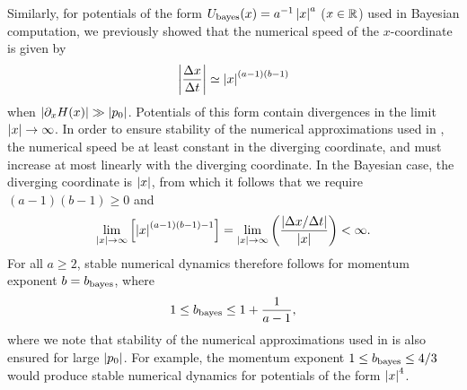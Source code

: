 \documentclass[a4paper]{article}
\begin{document}
Similarly, for potentials of the form $ U_{\rm bayes}(x) = a^{-1} \left| x \right|^a$ ($x \in \mathbb{R}$) used in Bayesian computation, we previously showed that the numerical speed of the $x$-coordinate is given by~\cite{Livingstone2019Kinetic}
\begin{align}
\left| \frac{\Delta x}{\Delta t} \right| \simeq \left| x \right|^{(a - 1)(b -1)} 
\end{align}
when $\left| \partial_x H (x) \right| \gg \left| p_0 \right|$. Potentials of this form contain divergences in the limit $\left| x \right| \to \infty$. In order to ensure stability of the numerical approximations used in , the numerical speed be at least constant in the diverging coordinate, and must increase at most linearly with the diverging coordinate. In the Bayesian case, the diverging coordinate is $\left| x \right|$, from which it follows that we require $(a - 1)(b -1) \ge 0$ and
\begin{align}
\lim_{\left| x \right| \to \infty} \left[ \left| x \right|^{(a - 1)(b -1) - 1} \right] = \lim_{\left| x \right| \to \infty} \left( \frac{\left| \Delta x / \Delta t \right|}{\left| x \right|} \right) < \infty .
\end{align}
For all $a \ge 2$, stable numerical dynamics therefore follows for momentum exponent $b = b_{\rm bayes}$, where 
\begin{align}
1 \le b_{\rm bayes} \le 1 + \frac{1}{a - 1} ,
\end{align}
where we note that stability of the numerical approximations used in  is also ensured for large $\left| p_0 \right|$. 
For example, the momentum exponent $1 \le b_{\rm bayes} \le 4 / 3$ would produce stable numerical dynamics for potentials of the form $\left| x \right|^4$. 
\end{document}
